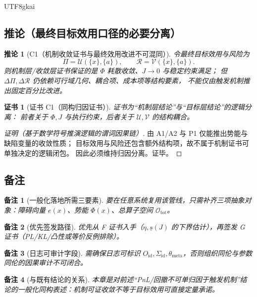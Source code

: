 \documentclass[12pt]{article}
\newtheorem{corollary}{推论}[section]
\newtheorem{remark}{备注}[section]
\newtheorem{Certificate}{证书}[section]
\begin{document}
\begin{CJK*}{UTF8}{gkai}
\subsection{推论（最终目标效用口径的必要分离）}
\label{subsec:tex28-ch14-corollaries}

\begin{corollary}[C1（机制收敛证书与最终效用改进不可混同）]
\label{cor:tex28-ch14-c1}
令最终目标效用与风险为
\[
  \Pi=\mathcal U(\{x\},\{a\}),
  \qquad
  \mathcal R=\mathcal V(\{x\},\{a\}).
\]
则机制层/收敛层证书保证的是 $\Phi$ 耗散收敛、$J\to 0$ 与稳定约束满足；
但 $\Delta\Pi,\Delta\mathcal R$ 仍依赖可行域几何、耦合项、成本项等结构要素，
不能仅由触发机制推出固定百分比改进。
\end{corollary}

\begin{Certificate}[证书 C1（同构归因证书）]
\label{cert:tex28-ch14-c1}
证书为“机制层结论”与“目标层结论”的逻辑分离：
前者关于 $\Phi,J$ 与执行约束，后者关于 $\mathcal U,\mathcal V$ 的结构耦合。
\end{Certificate}

\begin{proof}[证明（基于数学符号推演逻辑的谓词因果链）]
由 A1/A2 与 P1 仅能推出势能与缺陷变量的收敛性质；
目标效用与风险还包含额外结构项，故不属于机制证书可单独决定的逻辑闭包。
因此必须维持归因分离。证毕。
\end{proof}

\subsection{备注}
\label{subsec:tex28-ch14-remarks}

\begin{remark}[一般化落地所需三要素]
要在任意系统复用该管线，只需补齐三项抽象对象：障碍向量 $e(x)$、势能 $\Phi(x)$、总算子空间 $\mathcal O_{\mathrm{tot}}$。
\end{remark}

\begin{remark}[优先签发路径]
优先从 F 证书入手（$\eta,\underline s(J)$ 的下界估计），再签发 G 证书（PL/KL/凸性或等价反例排除）。
\end{remark}

\begin{remark}[日志可审计字段]
需确保日志可标识 $O_{\mathrm{id}},\Sigma_{\mathrm{id}},\theta_{\mathrm{meta}}$，否则组织同伦与参数同伦的因果审计不可闭合。
\end{remark}

\begin{remark}[与既有结论的关系]
本章是对前述“PnL/回撤不可单归因于触发机制”结论的一般化同构表述：机制可证收敛不等于目标效用可直接定量承诺。
\end{remark}


\end{CJK*}
\end{document}
